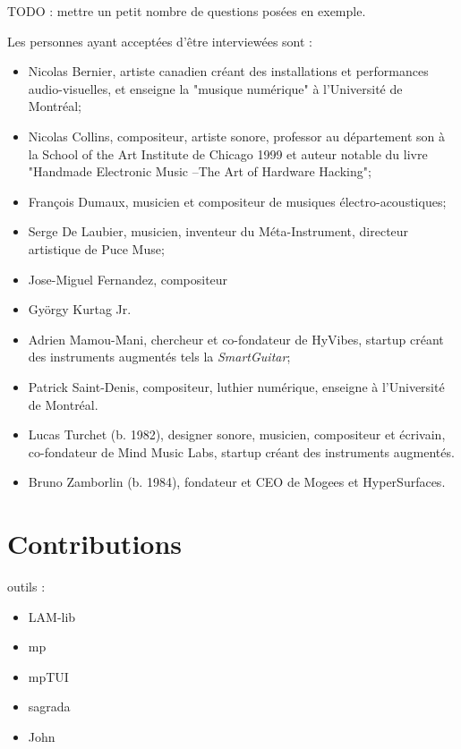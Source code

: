 TODO : mettre un petit nombre de questions posées en exemple.

Les personnes ayant acceptées d'être interviewées sont :

\vspace{-1em}
\begin{itemize}[noitemsep]
\item Nicolas Bernier, artiste canadien créant des installations et performances audio-visuelles, et enseigne la "musique numérique" à l'Université de Montréal;
\item Nicolas Collins, compositeur, artiste sonore, professor au département son  à la School of the Art Institute de Chicago 1999 et auteur notable du livre "Handmade Electronic Music –The Art of Hardware Hacking";
\item François Dumaux, musicien et compositeur de musiques électro-acoustiques;
\item Serge De Laubier, musicien, inventeur du Méta-Instrument, directeur artistique de Puce Muse;
\item Jose-Miguel Fernandez, compositeur 
\item György Kurtag Jr.
\item Adrien Mamou-Mani, chercheur et co-fondateur de HyVibes, startup créant des instruments augmentés tels la \textit{SmartGuitar};
\item Patrick Saint-Denis, compositeur, luthier numérique, enseigne à l'Université de Montréal.
\item Lucas Turchet (b. 1982), designer sonore, musicien, compositeur et écrivain, co-fondateur de Mind Music Labs, startup créant des instruments augmentés.
\item Bruno Zamborlin (b. 1984), fondateur et CEO de Mogees et HyperSurfaces. 
\end{itemize}



\section{Contributions}

outils :
\vspace{-1em}
\begin{itemize}[noitemsep]
\item LAM-lib
\item mp
\item mpTUI
\item sagrada
\item John
\end{itemize}


